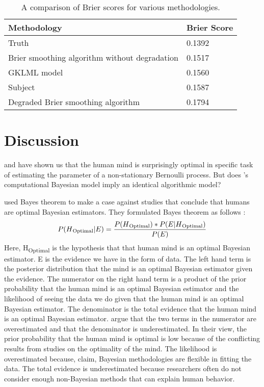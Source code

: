 \documentclass{article}
\begin{document}
\begin{table}[h!]
\centering
\begin{tabular}{ |p{10cm}|p{3cm}|  }
 \hline
 \textbf{Methodology} & \textbf{Brier Score}\\
 \hline
 Truth   & 0.1392   \\
\hline
 Brier smoothing algorithm without degradation &   0.1517 \\
\hline
 GKLML model &  0.1560\\
\hline
Subject &  0.1587\\
\hline
 Degraded Brier smoothing algorithm  & 0.1794\\
 \hline
\end{tabular}
\caption{A comparison of Brier scores for various methodologies.}
\label{table:1}
\end{table}


\label{results}

\section{Discussion}
\label{discussion}

\cite{robinson1964continuous} and \cite{gallistel2014perception} have shown us that the human mind is surprisingly optimal in specific task of estimating the parameter of a non-stationary Bernoulli process. But does \cite{gallistel2014perception}'s computational Bayesian model imply an identical algorithmic model? 

\cite{Bowers2012BayesianJS} used Bayes theorem to make a case against studies that conclude that humans are optimal Bayesian estimators. They formulated Bayes theorem as follows :
\[ P(H\textsubscript{Optimal} \vert E) = \frac{P(H\textsubscript{Optimal}) * P(E \vert H\textsubscript{Optimal})}{P(E)} \]
Here, H\textsubscript{Optimal} is the hypothesis that that human mind is an optimal Bayesian estimator. E is the evidence we have in the form of data. The left hand term is the posterior distribution that the mind is an optimal Bayesian estimator given the evidence. The numerator on the right hand term is a product of the prior probability that the human mind is an optimal Bayesian estimator and the likelihood of seeing the data we do given that the human mind is an optimal Bayesian estimator. The denominator is the total evidence that the human mind is an optimal Bayesian estimator. \cite{Bowers2012BayesianJS} argue that the two terms in the numerator are overestimated and that the denominator is underestimated. In their view, the prior probability that the human mind is optimal is low because of the conflicting results from studies on the optimality of the mind. The likelihood is overestimated because, \cite{Bowers2012BayesianJS} claim, Bayesian methodologies are flexible in fitting the data. The total evidence is underestimated because researchers often do not consider enough non-Bayesian methods that can explain human behavior. 
\end{document}
